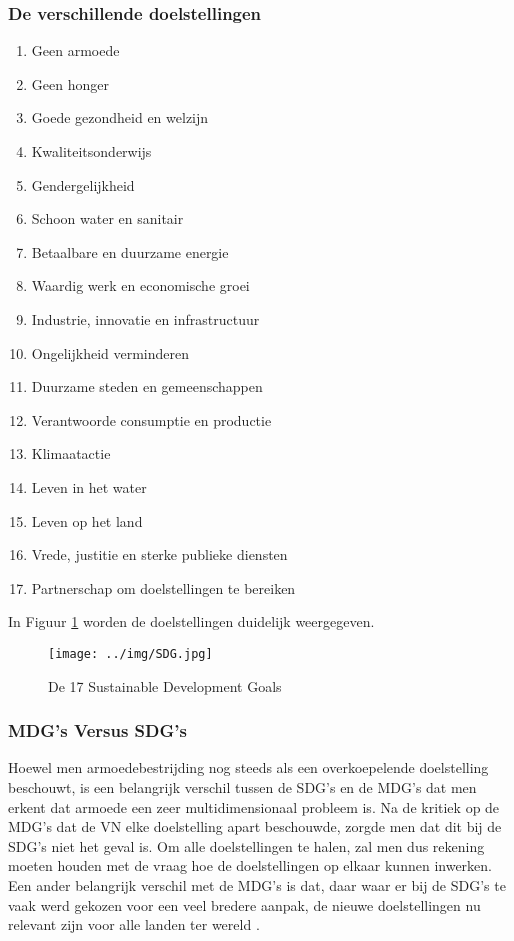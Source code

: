  \subsubsection{De verschillende doelstellingen}
 \begin{enumerate}
 	\item Geen armoede
 		\item Geen honger
 		\item Goede gezondheid en welzijn
 		\item Kwaliteitsonderwijs
 		\item Gendergelijkheid
 		\item Schoon water en sanitair
 		\item Betaalbare en duurzame energie
 		\item Waardig werk en economische groei
 		\item Industrie, innovatie en infrastructuur
 		\item Ongelijkheid verminderen
 		\item Duurzame steden en gemeenschappen
 		\item Verantwoorde consumptie en productie
 		\item Klimaatactie
 		\item Leven in het water
 		\item Leven op het land
 		\item Vrede, justitie en sterke publieke diensten
 		\item Partnerschap om doelstellingen te bereiken
 \end{enumerate}
\autocite{VerenigdeNaties2015}

In Figuur \ref{SDGs} worden de doelstellingen duidelijk weergegeven.
 
 \begin{figure}[h!]
 	\texttt{[image: ../img/SDG.jpg]}
 	\caption{De 17 Sustainable Development Goals \autocite{VerenigdeNaties2015}}
 	\label{SDGs}
 \end{figure}


\subsubsection{MDG's Versus SDG's}
Hoewel men armoedebestrijding nog steeds als een overkoepelende doelstelling beschouwt, is een belangrijk verschil tussen de SDG's en de  MDG's dat men erkent dat armoede een zeer multidimensionaal probleem is. Na de kritiek op de MDG's dat de VN elke doelstelling apart beschouwde, zorgde men dat dit bij de SDG's niet het geval is. Om alle doelstellingen te halen, zal men dus rekening moeten houden met de vraag hoe de doelstellingen op elkaar kunnen inwerken. Een ander belangrijk verschil met de MDG's is dat, daar waar er bij de SDG's te vaak werd gekozen voor een veel bredere aanpak, de nieuwe doelstellingen nu relevant zijn voor alle landen ter wereld \autocite{VN2015}.

